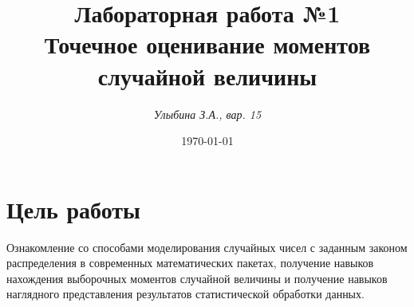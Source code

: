 \documentclass[a4paper,12pt,answers,noaddpoints]{exam}
\begin{document}
\title{Лабораторная работа №1 \\ Точечное оценивание моментов случайной величины}

\author{
	\textit{Улыбина З.А., вар. 15}
	   }


\date{\today}

\maketitle
\pagebreak
\section{Цель работы}
Ознакомление со способами моделирования случайных чисел с заданным законом распределения в современных математических пакетах, получение навыков нахождения выборочных моментов случайной величины и получение навыков наглядного представления результатов статистической обработки данных.
\end{document}
